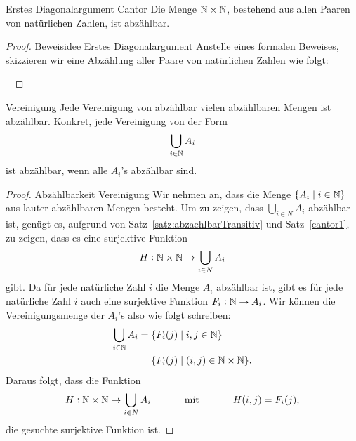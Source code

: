 \begin{lemma}{Erstes Diagonalargument Cantor}
Die Menge $\mathbb{N}\times\mathbb{N}$, bestehend aus allen Paaren von natürlichen Zahlen, ist abzählbar.
\end{lemma}
\begin{proof}{Beweisidee Erstes Diagonalargument}
Anstelle eines formalen Beweises, skizzieren wir eine Abzählung aller Paare von natürlichen Zahlen wie folgt:
\begin{center}
\end{center}
\ %
\end{proof}
\begin{lemma}{Vereinigung}
Jede Vereinigung von abzählbar vielen abzählbaren Mengen ist abzählbar. Konkret, jede Vereinigung von der Form
\[
\bigcup_{i\in\mathbb{N}}A_i
\]
ist abzählbar, wenn alle $A_i$'s abzählbar sind.
\end{lemma}
\begin{proof}{Abzählbarkeit Vereinigung}
Wir nehmen an, dass die Menge $\{A_i\mid i\in \mathbb{N} \}$ aus lauter abzählbaren Mengen besteht. Um zu zeigen, dass $\bigcup_{i\in N}A_i$ abzählbar ist, genügt es, aufgrund von Satz~\ref{satz:abzaehlbarTransitiv} und Satz~\ref{cantor1}, zu zeigen, dass es eine surjektive Funktion
\[
H:\mathbb{N}\times\mathbb{N}\to\bigcup_{i\in N}A_i
\]
gibt. Da für jede natürliche Zahl $i$ die Menge $A_i$ abzählbar ist, gibt es für jede natürliche Zahl $i$ auch eine surjektive Funktion $F_i:\mathbb{N}\to A_i$. Wir können die Vereinigungsmenge der $A_i$'s also wie folgt schreiben:
\begin{align*}
\bigcup_{i\in \mathbb{N}}A_i&=\{F_i(j)\mid i,j\in\mathbb{N} \}\\
&=\{F_i(j)\mid (i,j)\in\mathbb{N}\times\mathbb{N} \}.
\end{align*}
Daraus folgt, dass die Funktion
\[
H:\mathbb{N}\times\mathbb{N}\to \bigcup_{i\in N}A_i\phantom{abstand}\text{mit}\phantom{abstand} H(i,j)=F_i(j),
\]
die gesuchte surjektive Funktion ist.
\end{proof}

